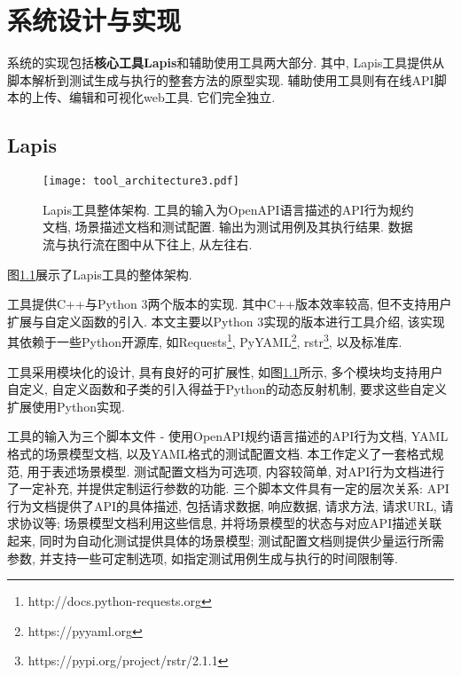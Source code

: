 \chapter{系统设计与实现}

    系统的实现包括\textbf{核心工具Lapis}和辅助使用工具两大部分. 其中, Lapis工具提供从脚本解析到测试生成与执行的整套方法的原型实现. 辅助使用工具则有在线API脚本的上传、编辑和可视化web工具. 它们完全独立.


	\section{Lapis}
	
	    \begin{figure}[!htb]
	        \centering
	        \texttt{[image: tool\_architecture3.pdf]}
	        \caption{Lapis工具整体架构. 工具的输入为OpenAPI语言描述的API行为规约文档, 场景描述文档和测试配置. 输出为测试用例及其执行结果. 数据流与执行流在图中从下往上, 从左往右.}
	        \label{fig:lapis_arch}
	    \end{figure}
	    
	    \label{sec:lapis_impl}
	    
	    图\ref{fig:lapis_arch}展示了Lapis工具的整体架构.
	    
	    工具提供C++与Python 3两个版本的实现. 其中C++版本效率较高, 但不支持用户扩展与自定义函数的引入. 本文主要以Python 3实现的版本进行工具介绍, 该实现其依赖于一些Python开源库, 如Requests\footnote{http://docs.python-requests.org}, PyYAML\footnote{https://pyyaml.org}, rstr\footnote{https://pypi.org/project/rstr/2.1.1}, 以及标准库.
	    
	    工具采用模块化的设计, 具有良好的可扩展性, 如图\ref{fig:lapis_arch}所示, 多个模块均支持用户自定义, 自定义函数和子类的引入得益于Python的动态反射机制, 要求这些自定义扩展使用Python实现.
	    
	    工具的输入为三个脚本文件 - 使用OpenAPI规约语言描述的API行为文档, YAML格式的场景模型文档, 以及YAML格式的测试配置文档. 本工作定义了一套格式规范, 用于表述场景模型. 测试配置文档为可选项, 内容较简单, 对API行为文档进行了一定补充, 并提供定制运行参数的功能. 三个脚本文件具有一定的层次关系: API行为文档提供了API的具体描述, 包括请求数据, 响应数据, 请求方法, 请求URL, 请求协议等; 场景模型文档利用这些信息, 并将场景模型的状态与对应API描述关联起来, 同时为自动化测试提供具体的场景模型; 测试配置文档则提供少量运行所需参数, 并支持一些可定制选项, 如指定测试用例生成与执行的时间限制等.
	    
